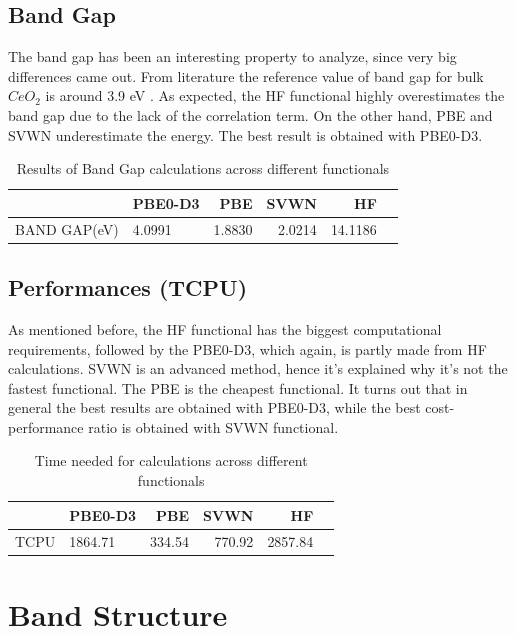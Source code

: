 \documentclass{article}
\begin{document}
\subsection{Band Gap}

The band gap has been an interesting property to analyze, since very big differences came out.
From literature the reference value of band gap for bulk $CeO_2$ is around 3.9 eV \cite{ceo2_band_gap}.
As expected, the HF functional highly overestimates the band gap due to the lack of the correlation term. On the other hand, PBE and SVWN underestimate the energy. The best result is obtained with PBE0-D3. 

\begin{table}[H]
	\centering
	\begin{tabular}{llrrrr}
		\toprule
		 & PBE0-D3 & PBE & SVWN & HF \\
		\midrule
		BAND GAP(eV) & 4.0991 & 1.8830 & 2.0214 & 14.1186 \\
	\end{tabular}	
	\caption{Results of Band Gap calculations across different functionals}
	\label{tab:band_gap}
\end{table}

\subsection{Performances (TCPU)}

As mentioned before, the HF functional has the biggest computational requirements, followed by the PBE0-D3, which again, is partly made from HF calculations. SVWN is an advanced method, hence it's explained why it's not the fastest functional. The PBE is the cheapest functional. It turns out that in general the best results are obtained with PBE0-D3, while the best cost-performance ratio is obtained with SVWN functional.

\begin{table}[H]
	\centering
	\begin{tabular}{llrrrr}
		\toprule
		 & PBE0-D3 & PBE & SVWN & HF \\
		\midrule
		TCPU & 1864.71 & 334.54 & 770.92 & 2857.84 \\
	\end{tabular}	
	\caption{Time needed for calculations across different functionals}
	\label{tab:TCPU}
\end{table}

\newpage
\section{Band Structure}
\end{document}
